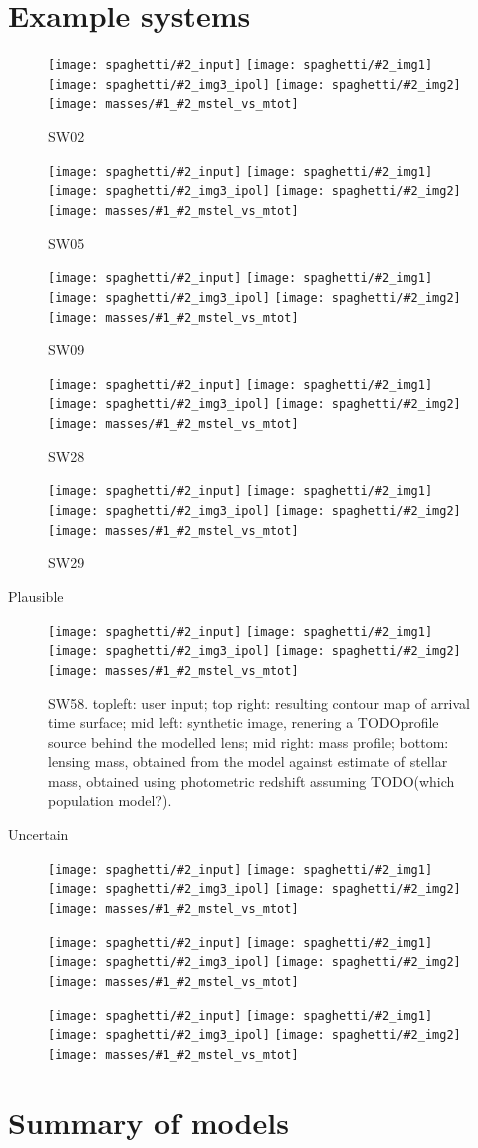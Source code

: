 \documentclass[fleqn,usenatbib]{mnras}
\newcommand{\inclfig}[2]{
  \centering
	\texttt{[image: spaghetti/\#2\_input]}%
	\texttt{[image: spaghetti/\#2\_img1]}
	\texttt{[image: spaghetti/\#2\_img3\_ipol]}%
	\texttt{[image: spaghetti/\#2\_img2]}
	\texttt{[image: masses/\#1\_\#2\_mstel\_vs\_mtot]}
}
\begin{document}
\section{Example systems}

\begin{figure}
  \inclfig{SW02}{ASW000619d_011489}
  \caption{SW02}
  \label{fig:SW02}
\end{figure}

\begin{figure}
  \inclfig{SW05}{ASW0007k4r_AJIBCHQ6EM}
  \caption{SW05}
  \label{fig:SW05}
\end{figure}

\begin{figure}
  \inclfig{SW09}{ASW0002asp_5EKMWWVJHL}
  \caption{SW09}
  \label{fig:SW09}
\end{figure}

\begin{figure}
  \inclfig{SW28}{ASW0007xrs_JHC3J2HYV7}
  \caption{SW28}
  \label{fig:SW28}
\end{figure}

\begin{figure}
  \inclfig{SW29}{ASW0008qsm_TOFS7JNGEK}
  \caption{SW29}
  \label{fig:SW29}
\end{figure}

Plausible

\begin{figure}
  \inclfig{SW58}{ASW0007iwp_4XBJWT3COV}
  \caption{SW58. topleft: user input; top right: resulting contour map of arrival time surface; mid left: synthetic image, renering a TODO{profile} source behind the modelled lens; mid right: mass profile; bottom: lensing mass, obtained from the model against estimate of stellar mass, obtained using photometric redshift assuming TODO(which population model?).}
  \label{fig:SW58}
\end{figure}

Uncertain

\begin{figure}
  \inclfig{SW36}{ASW000096t_7IPP7LWVOF}
\end{figure}

\begin{figure}
	\inclfig{SW19}{ASW0001ld7_OS3CYAKLRT}
\end{figure}


\begin{figure}
	\inclfig{SW57}{ASW0008pag_5SXGXQYY6V}
\end{figure}


\section{Summary of models}
\end{document}
